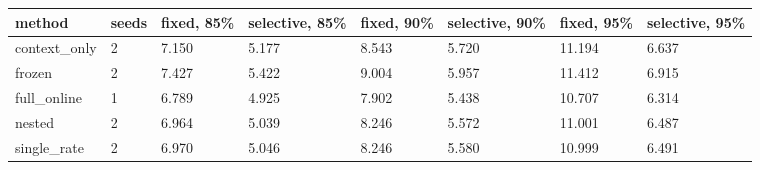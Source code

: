 \begin{tabular}{llllllll}
\hline
method & seeds & fixed, 85\% & selective, 85\% & fixed, 90\% & selective, 90\% & fixed, 95\% & selective, 95\% \\
\hline
context\_only & 2 & 7.150 & 5.177 & 8.543 & 5.720 & 11.194 & 6.637 \\
frozen & 2 & 7.427 & 5.422 & 9.004 & 5.957 & 11.412 & 6.915 \\
full\_online & 1 & 6.789 & 4.925 & 7.902 & 5.438 & 10.707 & 6.314 \\
nested & 2 & 6.964 & 5.039 & 8.246 & 5.572 & 11.001 & 6.487 \\
single\_rate & 2 & 6.970 & 5.046 & 8.246 & 5.580 & 10.999 & 6.491 \\
\hline
\end{tabular}
